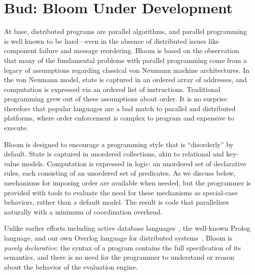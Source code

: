 \section{Bud: Bloom Under Development}
\label{sec:lang}
At base, distributed programs are parallel algorithms, and parallel programming is well known to be hard---even in the absence of distributed issues like component failure and message reordering.  Bloom is based on the observation that many of the fundamental problems with parallel programming come from a legacy of assumptions regarding classical von Neumann machine architectures.  In the von Neumann model, state is captured in an ordered array of addresses, and computation is expressed via an ordered list of instructions.  Traditional programming grew out of these assumptions about order.  It is no surprise therefore that popular languages are a bad match to parallel and distributed platforms, where order enforcement is complex to program and expensive to execute.

Bloom is designed to encourage a programming style that is ``disorderly'' by default.  State is captured in unordered collections, akin to relational and key-value models.  Computation is expressed in logic: an unordered set of declarative rules, each consisting of an unordered set of predicates.  As we discuss below, mechanisms for imposing order are available when needed, but the programmer is provided with tools to evaluate the need for these mechanisms as special-case behaviors, rather than a default model.  The result is code that parallelizes naturally with a minimum of coordination overhead.

 
Unlike earlier efforts including active database languages~\cite{widom1996active}, the well-known Prolog language, and our own Overlog language for distributed systems~\cite{p2}, Bloom is {\em purely declarative}: the syntax of a program contains the full specification of its semantics, and there is no need for the programmer to understand or reason about the behavior of the evaluation engine.  


